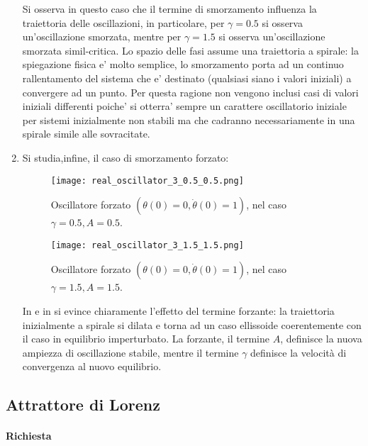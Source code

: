 \begin{enumerate}
	      Si osserva in questo caso che il termine di smorzamento influenza la traiettoria delle oscillazioni, in particolare, per $\gamma=0.5$ si osserva un'oscillazione smorzata, mentre per $\gamma=1.5$ si osserva un'oscillazione smorzata simil-critica. Lo spazio delle fasi assume una traiettoria a spirale: la spiegazione fisica e' molto semplice, lo smorzamento porta ad un continuo rallentamento del sistema che e' destinato (qualsiasi siano i valori iniziali) a convergere ad un punto. Per questa ragione non vengono inclusi casi di valori iniziali differenti poiche' si otterra' sempre un carattere oscillatorio iniziale per sistemi inizialmente non stabili ma che cadranno necessariamente in una spirale simile alle sovracitate.

	\item Si studia,infine, il caso di smorzamento forzato:

	      \begin{figure} [H]
		      \centering
		      \texttt{[image: real\_oscillator\_3\_0.5\_0.5.png]}
		      \caption{Oscillatore forzato $(\theta(0)=0, \dot{\theta}(0)=1)$, nel caso $\gamma=0.5, A=0.5$.}
	      \end{figure}

	      \begin{figure} [H]
		      \centering
		      \texttt{[image: real\_oscillator\_3\_1.5\_1.5.png]}
		      \caption{Oscillatore forzato $(\theta(0)=0, \dot{\theta}(0)=1)$, nel caso $\gamma=1.5, A=1.5$.}
	      \end{figure}

	      In  e in  si evince chiaramente l'effetto del termine forzante: la traiettoria inizialmente a spirale si dilata e torna ad un caso ellissoide coerentemente con il caso in equilibrio imperturbato. La forzante, il termine $A$, definisce la nuova ampiezza di oscillazione stabile, mentre il termine $\gamma$ definisce la velocità di convergenza al nuovo equilibrio.



\end{enumerate}



\subsection{Attrattore di Lorenz}

\paragraph{Richiesta}

